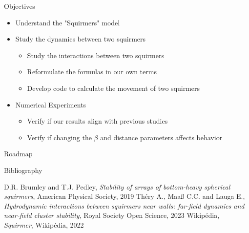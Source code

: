 \documentclass{beamer}
\begin{document}
\begin{frame}{Objectives}
    \begin{itemize}
        \item Understand the "Squirmers" model
        \item Study the dynamics between two squirmers
        \begin{itemize}
            \item Study the interactions between two squirmers
            \item Reformulate the formulas in our own terms
            \item Develop code to calculate the movement of two squirmers
        \end{itemize}
        \item Numerical Experiments
        \begin{itemize}
            \item Verify if our results align with previous studies
            \item Verify if changing the $\beta$ and distance parameters affects behavior
        \end{itemize}
    \end{itemize}
\end{frame}

\begin{frame}{Roadmap}
    
\end{frame}

\begin{frame}{Bibliography}
    \begin{thebibliography}{3}
         D.R. Brumley and T.J. Pedley, \emph{Stability of arrays of bottom-heavy spherical squirmers}, American Physical Society, 2019
         Théry A., Maaß C.C. and Lauga E., \emph{Hydrodynamic interactions between squirmers near walls: far-field dynamics and near-field cluster stability}, Royal Society Open Science, 2023
         Wikipédia, \emph{Squirmer}, Wikipédia, 2022
    \end{thebibliography}
\end{frame}
\end{document}
